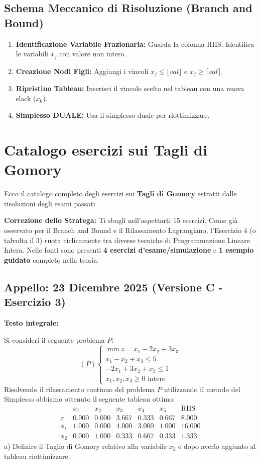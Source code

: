 \documentclass[11pt, a4paper]{article}
\begin{document}
\subsection{Schema Meccanico di Risoluzione (Branch and Bound)}
\begin{enumerate}
    \item \textbf{Identificazione Variabile Frazionaria:} Guarda la colonna RHS. Identifica le variabili $x_j$ con valore non intero.
    \item \textbf{Creazione Nodi Figli:} Aggiungi i vincoli $x_j \le \lfloor val \rfloor$ e $x_j \ge \lceil val \rceil$.
    \item \textbf{Ripristino Tableau:} Inserisci il vincolo scelto nel tableau con una nuova slack ($x_6$).
    \item \textbf{Simplesso DUALE:} Usa il simplesso duale per riottimizzare.
\end{enumerate}

\section{Catalogo esercizi sui Tagli di Gomory}

Ecco il catalogo completo degli esercizi sui \textbf{Tagli di Gomory} estratti dalle risoluzioni degli esami passati.

\textbf{Correzione dello Stratega:} Ti sbagli nell'aspettarti 15 esercizi. Come già osservato per il Branch and Bound e il Rilassamento Lagrangiano, l'Esercizio 4 (o talvolta il 3) ruota ciclicamente tra diverse tecniche di Programmazione Lineare Intera. Nelle fonti sono presenti \textbf{4 esercizi d'esame/simulazione} e \textbf{1 esempio guidato} completo nella teoria.

\bigskip

\subsection{Appello: 23 Dicembre 2025 (Versione C - Esercizio 3)}

\textbf{Testo integrale:}

Si consideri il seguente problema $P$:
\[
(P)
\begin{cases}
\min z = x_1 - 2x_2 + 3x_3 \\
x_1 - x_2 + x_3 \le 5 \\
-2x_1 + 3x_2 + x_3 \le 1 \\
x_1, x_2, x_3 \ge 0 \text{ intere}
\end{cases}
\]
Risolvendo il rilassamento continuo del problema $P$ utilizzando il metodo del Simplesso abbiamo ottenuto il seguente tableau ottimo:
\[
\begin{array}{c|ccccc|c}
   & x_1 & x_2 & x_3 & x_4 & x_5 & \text{RHS} \\
\hline
z  & 0.000 & 0.000 & 3.667 & 0.333 & 0.667 & 8.000 \\
\hline
x_1 & 1.000 & 0.000 & 4.000 & 3.000 & 1.000 & 16.000 \\
x_2 & 0.000 & 1.000 & 0.333 & 0.667 & 0.333 & 1.333
\end{array}
\]
a) Definire il Taglio di Gomory relativo alla variabile $x_2$ e dopo averlo aggiunto al tableau riottimizzare.
\end{document}
